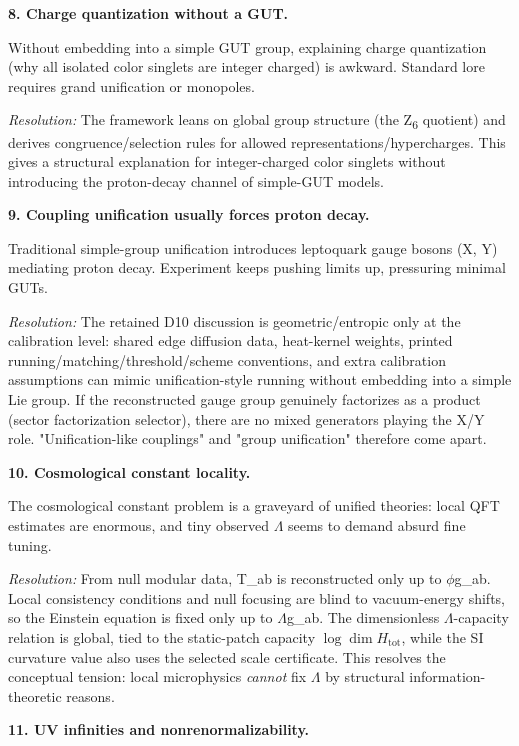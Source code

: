 \textbf{8. Charge quantization without a GUT.}

Without embedding into a simple GUT group, explaining charge quantization (why all isolated color singlets are integer charged) is awkward. Standard lore requires grand unification or monopoles.

\emph{Resolution:} The framework leans on global group structure (the Z\textsubscript{6} quotient) and derives congruence/selection rules for allowed representations/hypercharges. This gives a structural explanation for integer-charged color singlets without introducing the proton-decay channel of simple-GUT models.

\textbf{9. Coupling unification usually forces proton decay.}

Traditional simple-group unification introduces leptoquark gauge bosons (X, Y) mediating proton decay. Experiment keeps pushing limits up, pressuring minimal GUTs.

\emph{Resolution:} The retained D10 discussion is geometric/entropic only at the calibration level: shared edge diffusion data, heat-kernel weights, printed running/matching/threshold/scheme conventions, and extra calibration assumptions can mimic unification-style running without embedding into a simple Lie group. If the reconstructed gauge group genuinely factorizes as a product (sector factorization selector), there are no mixed generators playing the X/Y role. "Unification-like couplings" and "group unification" therefore come apart.

\textbf{10. Cosmological constant locality.}

The cosmological constant problem is a graveyard of unified theories: local QFT estimates are enormous, and tiny observed \ensuremath{\Lambda} seems to demand absurd fine tuning.

\emph{Resolution:} From null modular data, T\_ab is reconstructed only up to \ensuremath{\phi}g\_ab. Local consistency conditions and null focusing are blind to vacuum-energy shifts, so the Einstein equation is fixed only up to \ensuremath{\Lambda}g\_ab. The dimensionless \ensuremath{\Lambda}-capacity relation is global, tied to the static-patch capacity \(\log\dim H_{\mathrm{tot}}\), while the SI curvature value also uses the selected scale certificate. This resolves the conceptual tension: local microphysics \emph{cannot} fix \ensuremath{\Lambda} by structural information-theoretic reasons.

\textbf{11. UV infinities and nonrenormalizability.}

